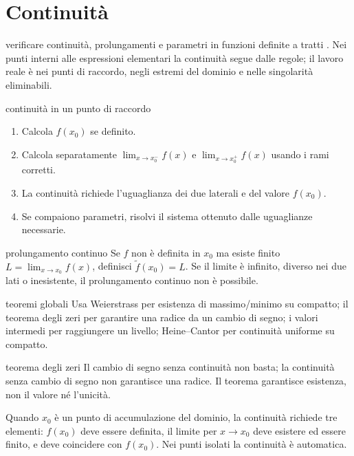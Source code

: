 \chapter{Continuità}
\label{chap:8}

\begin{obiettivocapitolo}{verificare continuità, prolungamenti e parametri in funzioni definite a tratti}
\prioritaalta. Nei punti interni alle espressioni elementari la continuità segue dalle regole; il lavoro reale è nei punti di raccordo, negli estremi del dominio e nelle singolarità eliminabili.
\end{obiettivocapitolo}
\begin{proceduraesame}{continuità in un punto di raccordo}
\begin{enumerate}
\item Calcola $f(x_0)$ se definito.
\item Calcola separatamente $\lim_{x\to x_0^-}f(x)$ e $\lim_{x\to x_0^+}f(x)$ usando i rami corretti.
\item La continuità richiede l'uguaglianza dei due laterali e del valore $f(x_0)$.
\item Se compaiono parametri, risolvi il sistema ottenuto dalle uguaglianze necessarie.
\end{enumerate}
\end{proceduraesame}
\begin{proceduraesame}{prolungamento continuo}
Se $f$ non è definita in $x_0$ ma esiste finito $L=\lim_{x\to x_0}f(x)$, definisci $\widetilde f(x_0)=L$. Se il limite è infinito, diverso nei due lati o inesistente, il prolungamento continuo non è possibile.
\end{proceduraesame}
\begin{sceltametodo}{teoremi globali}
Usa Weierstrass per esistenza di massimo/minimo su compatto; il teorema degli zeri per garantire una radice da un cambio di segno; i valori intermedi per raggiungere un livello; Heine--Cantor per continuità uniforme su compatto.
\end{sceltametodo}
\begin{errorefrequente}{teorema degli zeri}
Il cambio di segno senza continuità non basta; la continuità senza cambio di segno non garantisce una radice. Il teorema garantisce esistenza, non il valore né l'unicità.
\end{errorefrequente}

Quando \(x_0\) è un punto di accumulazione del dominio, la continuità richiede tre elementi: \(f(x_0)\) deve essere definita, il limite per \(x\to x_0\) deve esistere ed essere finito, e deve coincidere con \(f(x_0)\). Nei punti isolati la continuità è automatica.

